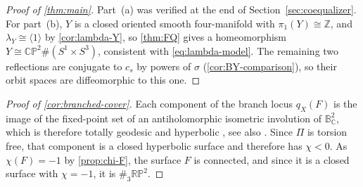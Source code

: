 \documentclass[11pt]{amsart}
\theoremstyle{definition}
\theoremstyle{remark}
\newcommand{\Z}{\mathbb Z}
\newcommand{\C}{\mathbb C}
\newcommand{\CP}{\mathbb{CP}}
\newcommand{\RP}{\mathbb{RP}}
\newcommand{\B}{\mathbb B^2_{\C}}
\newcommand{\PiCS}{\Pi}
\begin{document}
\begin{proof}[Proof of \cref{thm:main}]
Part~(a) was verified at the end of Section~\ref{sec:coequalizer}.
For part~(b), $Y$ is a closed oriented smooth four-manifold with
$\pi_1(Y)\cong\Z$, and $\lambda_Y\cong\langle1\rangle$ by
\cref{cor:lambda-Y}, so \cref{thm:FQ} gives a homeomorphism
$Y\cong\CP^2\#(S^1\times S^3)$, consistent with
\eqref{eq:lambda-model}.  The remaining two reflections are conjugate
to $c_s$ by powers of $\sigma$ (\cref{cor:BY-comparison}), so their
orbit spaces are diffeomorphic to this one.
\end{proof}
  
\begin{proof}[Proof of \cref{cor:branched-cover}]
Each component of the branch locus $q_X(F)$ is the image of the fixed-point
set of an antiholomorphic isometric involution of $\B$, which is
therefore totally geodesic and hyperbolic \cite[Section~2.5]{GKL}, see
also \cite[Theorem~5.2]{KharKul}. Since $\PiCS$ is torsion free, that
component is a closed hyperbolic surface and therefore has $\chi<0$.
As $\chi(F)=-1$ by \cref{prop:chi-F}, the surface $F$ is connected,
and since it is a closed surface with $\chi=-1$, it is
$\#_3\RP^2$.
\end{proof}
\end{document}
